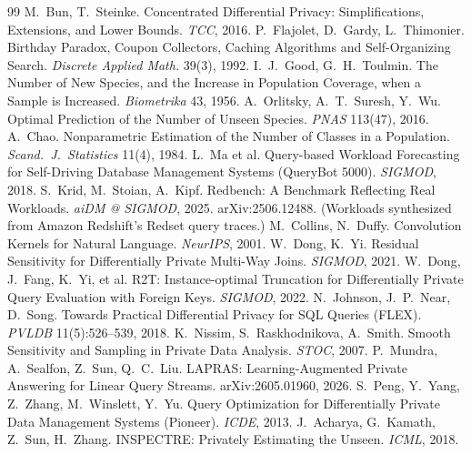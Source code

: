 \documentclass[sigconf,nonacm]{acmart}
\begin{document}
\begin{thebibliography}{99}
 M.\ Bun, T.\ Steinke. Concentrated Differential Privacy: Simplifications, Extensions, and Lower Bounds. \emph{TCC}, 2016.
 P.\ Flajolet, D.\ Gardy, L.\ Thimonier. Birthday Paradox, Coupon Collectors, Caching Algorithms and Self-Organizing Search. \emph{Discrete Applied Math.} 39(3), 1992.
 I.\ J.\ Good, G.\ H.\ Toulmin. The Number of New Species, and the Increase in Population Coverage, when a Sample is Increased. \emph{Biometrika} 43, 1956.
 A.\ Orlitsky, A.\ T.\ Suresh, Y.\ Wu. Optimal Prediction of the Number of Unseen Species. \emph{PNAS} 113(47), 2016.
 A.\ Chao. Nonparametric Estimation of the Number of Classes in a Population. \emph{Scand.\ J.\ Statistics} 11(4), 1984.
 L.\ Ma et al. Query-based Workload Forecasting for Self-Driving Database Management Systems (QueryBot 5000). \emph{SIGMOD}, 2018.
 S.\ Krid, M.\ Stoian, A.\ Kipf. Redbench: A Benchmark Reflecting Real Workloads. \emph{aiDM @ SIGMOD}, 2025. arXiv:2506.12488. (Workloads synthesized from Amazon Redshift's Redset query traces.)
 M.\ Collins, N.\ Duffy. Convolution Kernels for Natural Language. \emph{NeurIPS}, 2001.
 W.\ Dong, K.\ Yi. Residual Sensitivity for Differentially Private Multi-Way Joins. \emph{SIGMOD}, 2021.
 W.\ Dong, J.\ Fang, K.\ Yi, et al. R2T: Instance-optimal Truncation for Differentially Private Query Evaluation with Foreign Keys. \emph{SIGMOD}, 2022.
 N.\ Johnson, J.\ P.\ Near, D.\ Song. Towards Practical Differential Privacy for SQL Queries (FLEX). \emph{PVLDB} 11(5):526--539, 2018.
 K.\ Nissim, S.\ Raskhodnikova, A.\ Smith. Smooth Sensitivity and Sampling in Private Data Analysis. \emph{STOC}, 2007.
 P.\ Mundra, A.\ Sealfon, Z.\ Sun, Q.\ C.\ Liu. LAPRAS: Learning-Augmented Private Answering for Linear Query Streams. arXiv:2605.01960, 2026.
 S.\ Peng, Y.\ Yang, Z.\ Zhang, M.\ Winslett, Y.\ Yu. Query Optimization for Differentially Private Data Management Systems (Pioneer). \emph{ICDE}, 2013.
 J.\ Acharya, G.\ Kamath, Z.\ Sun, H.\ Zhang. INSPECTRE: Privately Estimating the Unseen. \emph{ICML}, 2018.

\end{thebibliography}
\end{document}
